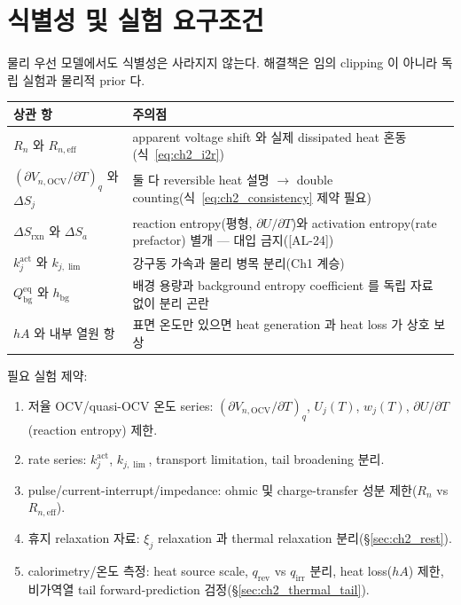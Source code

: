 \documentclass[11pt,a4paper]{article}
\newcommand{\eff}{\mathrm{eff}}
\newcommand{\eq}{\mathrm{eq}}
\newcommand{\bg}{\mathrm{bg}}
\newcommand{\OCV}{\mathrm{OCV}}
\newcommand{\irr}{\mathrm{irr}}
\newcommand{\rev}{\mathrm{rev}}
\newcommand{\rxn}{\mathrm{rxn}}
\newcommand{\AL}[1]{\textsf{[AL-#1]}}
\begin{document}
\section{식별성 및 실험 요구조건}\label{sec:ch2_ident}
물리 우선 모델에서도 식별성은 사라지지 않는다. 해결책은 임의 clipping 이 아니라 독립 실험과 물리적 prior 다.
\begin{longtable}{p{} p{}}
\toprule 상관 항 & 주의점 \\ \midrule \endhead
$R_n$ 와 $R_{n,\eff}$ & apparent voltage shift 와 실제 dissipated heat 혼동(식~\eqref{eq:ch2_i2r}) \\
$(\partial V_{n,\OCV}/\partial T)_q$ 와 $\Delta S_j$ & 둘 다 reversible heat 설명 $\to$ double counting(식~\eqref{eq:ch2_consistency} 제약 필요) \\
$\Delta S_{\rxn}$ 와 $\Delta S_a$ & reaction entropy(평형, $\partial U/\partial T$)와 activation entropy(rate prefactor) 별개 — 대입 금지(\AL{24}) \\
$k_j^{\mathrm{act}}$ 와 $k_{j,\lim}$ & 강구동 가속과 물리 병목 분리(Ch1 계승) \\
$Q_\bg^{\eq}$ 와 $h_\bg$ & 배경 용량과 background entropy coefficient 를 독립 자료 없이 분리 곤란 \\
$hA$ 와 내부 열원 항 & 표면 온도만 있으면 heat generation 과 heat loss 가 상호 보상 \\
\bottomrule
\end{longtable}
필요 실험 제약:
\begin{enumerate}[label=\arabic*),leftmargin=2.0em]
\item 저율 OCV/quasi-OCV 온도 series: $(\partial V_{n,\OCV}/\partial T)_q$, $U_j(T)$, $w_j(T)$, $\partial U/\partial T$(reaction entropy) 제한.
\item rate series: $k_j^{\mathrm{act}}$, $k_{j,\lim}$, transport limitation, tail broadening 분리.
\item pulse/current-interrupt/impedance: ohmic 및 charge-transfer 성분 제한($R_n$ vs $R_{n,\eff}$).
\item 휴지 relaxation 자료: $\xi_j$ relaxation 과 thermal relaxation 분리(\S\ref{sec:ch2_rest}).
\item calorimetry/온도 측정: heat source scale, $q_\rev$ vs $q_\irr$ 분리, heat loss($hA$) 제한, 비가역열 tail forward-prediction 검정(\S\ref{sec:ch2_thermal_tail}).
\end{enumerate}

\end{document}
